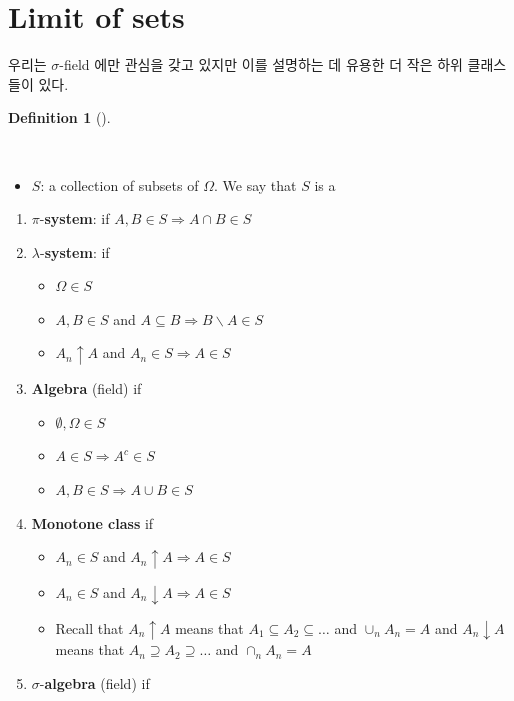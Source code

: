 \documentclass[
  13pt,
  letterpaper,
  DIV=11,
  numbers=noendperiod]{scrreprt}
\providecommand{\tightlist}{%
  \setlength{\itemsep}{0pt}\setlength{\parskip}{0pt}}\usepackage{longtable,booktabs,array}
\theoremstyle{plain}
\theoremstyle{definition}
\theoremstyle{definition}
\newtheorem{definition}{Definition}[chapter]
\theoremstyle{plain}
\theoremstyle{definition}
\theoremstyle{plain}
\theoremstyle{remark}
\begin{document}
\section{Limit of sets}\label{limit-of-sets}

우리는 \(\sigma\)-field 에만 관심을 갖고 있지만 이를 설명하는 데 유용한
더 작은 하위 클래스들이 있다.

\begin{definition}[]\protect\hypertarget{def-algebra}{}\label{def-algebra}

~

\begin{itemize}
\tightlist
\item
  \(S\): a collection of subsets of \(\Omega\). We say that \(S\) is a
\end{itemize}

\begin{enumerate}
\def\labelenumi{\arabic{enumi}.}
\item
  \(\pi\)-\textbf{system}: if
  \(A, B \in S \Longrightarrow A\cap B \in S\)
\item
  \(\lambda\)-\textbf{system}: if

  \begin{itemize}
  \tightlist
  \item
    \(\Omega \in S\)
  \item
    \(A, B \in S\) and
    \(A \subseteq B \Longrightarrow B \backslash A \in S\)
  \item
    \(A_n \uparrow A\) and \(A_n \in S \Longrightarrow A \in S\)
  \end{itemize}
\item
  \textbf{Algebra} (field) if

  \begin{itemize}
  \tightlist
  \item
    \(\emptyset , \Omega \in S\)
  \item
    \(A \in S \Longrightarrow A^c \in S\)
  \item
    \(A, B \in S \Longrightarrow A\cup B \in S\)
  \end{itemize}
\item
  \textbf{Monotone class} if

  \begin{itemize}
  \tightlist
  \item
    \(A_n \in S\) and \(A_n \uparrow A \Longrightarrow A \in S\)
  \item
    \(A_n \in S\) and \(A_n \downarrow A \Longrightarrow A \in S\)
  \item
    Recall that \(A_n \uparrow A\) means that
    \(A_1 \subseteq A_2 \subseteq \ldots\) and \(\cup_n A_n = A\) and
    \(A_n \downarrow A\) means that
    \(A_n \supseteq A_2 \supseteq \ldots\) and \(\cap_n A_n = A\)
  \end{itemize}
\item
  \(\sigma\)-\textbf{algebra} (field) if


\end{enumerate}
\end{definition}
\end{document}
